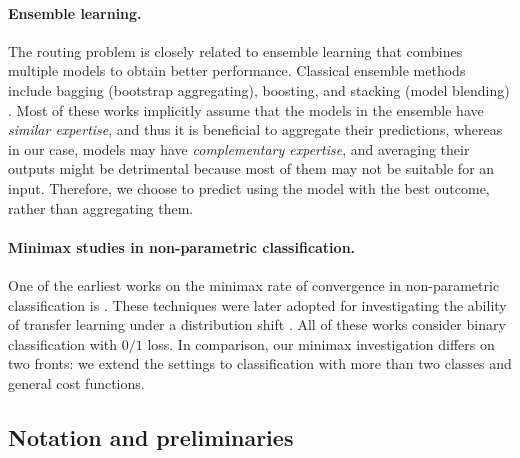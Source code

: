 \paragraph{Ensemble learning.} The routing problem is closely related to ensemble learning that combines multiple models to obtain better performance. Classical ensemble methods include bagging (bootstrap aggregating), boosting, and
stacking (model blending) \citep{breiman1996bagging,breiman1996stacked,freund1996experiments,friedman2001greedy,wolpert1992stacked}. Most of these works implicitly assume that the models in the ensemble have \emph{similar expertise}, and
thus it is beneficial to aggregate their predictions, whereas in our case, models may have \emph{complementary expertise}, and averaging their outputs might be detrimental because most of them may not be suitable for an input. Therefore, we choose to predict using the model with the best outcome, rather than aggregating them. 

\paragraph{Minimax studies in non-parametric classification.} One of the earliest works on the minimax rate of convergence in non-parametric classification is \citet{audibert2007Fast}. These techniques were later adopted for investigating the ability of transfer learning under a distribution shift
\citep{kpotufe2018Marginal,cai2019Transfer,maity2022minimax}. All of these works consider binary classification with $0/1$ loss. In comparison, our minimax investigation differs on two fronts: we extend the settings to classification with more than two classes and general cost functions. 



\subsection{Notation and preliminaries}

